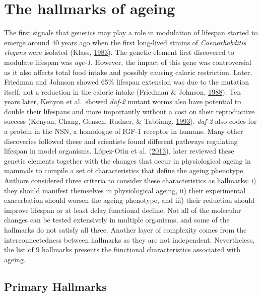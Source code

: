 \documentclass[12pt,twoside]{unicam}
\begin{document}
\hypertarget{introHallmarks}{%
\section{The hallmarks of ageing}\label{introHallmarks}}

The first signals that genetics may play a role in modulation of lifespan started to emerge around 40 years ago when the first long-lived strains of \emph{Caenorhabditis elegans} were isolated (Klass, \protect\hyperlink{ref-Klass1983}{1983}). The genetic element first discovered to modulate lifespan was \emph{age-1}. However, the impact of this gene was controversial as it also affects total food intake and possibly causing caloric restriction. Later, Friedman and Johnson showed 65\% lifespan extension was due to the mutation itself, not a reduction in the caloric intake (Friedman \& Johnson, \protect\hyperlink{ref-Friedman1988}{1988}). Ten years later, Kenyon et al.~showed \emph{daf-2} mutant worms also have potential to double their lifespans and more importantly without a cost on their reproductive success (Kenyon, Chang, Gensch, Rudner, \& Tabtiang, \protect\hyperlink{ref-Kenyon1993}{1993}). \emph{daf-2} also codes for a protein in the NSN, a homologue of IGF-1 receptor in humans. Many other discoveries followed these and scientists found different pathways regulating lifespan in model organisms. López-Otı́n et al. (\protect\hyperlink{ref-Lopez-Otin2013}{2013}), later reviewed these genetic elements together with the changes that occur in physiological ageing in mammals to compile a set of characteristics that define the ageing phenotype. Authors considered three criteria to consider these characteristics as hallmarks: i) they should manifest themselves in physiological ageing, ii) their experimental exacerbation should worsen the ageing phenotype, and iii) their reduction should improve lifespan or at least delay functional decline. Not all of the molecular changes can be tested extensively in multiple organisms, and some of the hallmarks do not satisfy all three. Another layer of complexity comes from the interconnectedness between hallmarks as they are not independent. Nevertheless, the list of 9 hallmarks presents the functional characteristics associated with ageing.

\hypertarget{introPrimaryHallmarks}{%
\subsection{Primary Hallmarks}\label{introPrimaryHallmarks}}
\end{document}
